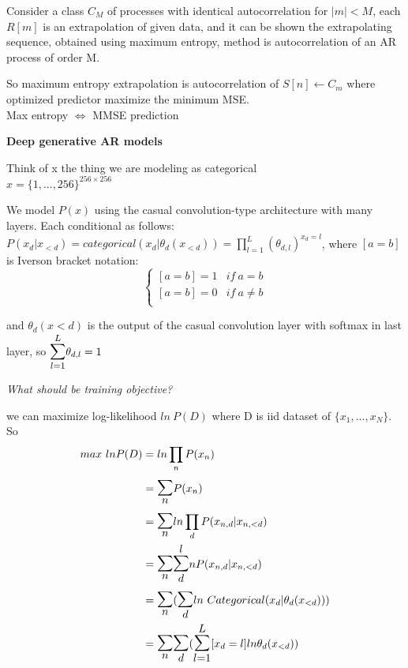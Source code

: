 \documentclass[12pt,a4paper]{article}
\begin{document}
Consider a class $C_M$ of processes with identical autocorrelation for $|m|<M$, each $R[m]$ is an extrapolation of given data, and it can be shown the extrapolating sequence, obtained using maximum entropy, method is autocorrelation of an AR process of order M. 

So maximum entropy extrapolation is autocorrelation of $S[n]\leftarrow C_m$ where optimized predictor maximize the minimum MSE. \\
Max entropy $\Leftrightarrow$ MMSE prediction

\vspace{0.5cm}
\textbf{Deep generative AR models}

Think of x the thing we are modeling as categorical\\
$x=\{1, ..., 256\}^{256\times 256}$

We model $P(x)$ using the casual convolution-type architecture with many layers. Each conditional as follows:\\
$P(x_d|x_{<d})=categorical(x_d|\theta_d(x_{<d}))=\prod_{l=1}^L (\theta_{d,l})^{x_d=l}$, where $[a=b]$ is Iverson bracket notation:
\begin{equation*}
\begin{cases}
[a=b]=1 & if\ a=b\\
[a=b]=0 & if\ a\neq b\\
\end{cases}
\end{equation*}

and $\theta_d(x<d)$ is the output of the casual convolution layer with softmax in last layer, so $\bsum{l=1}{L}\theta_{d,l}=1$


\vspace{0.5cm}
\textit{What should be training objective?}

we can maximize log-likelihood $ln\ P(D)$ where D is iid dataset of $\{x_1,...,x_N\}$. So\\
\begin{equation*}
    \begin{split}
max\ lnP(D) &= ln\prod_nP(x_n)\\
&=\bsum{n}{} P(x_n)\\
&=\bsum{n}{} ln\prod_dP(x_{n,d}|x_{n,<d})\\
&=\bsum{n}{} \bsum{d} ln P(x_{n,d}|x_{n,<d})\\
&=\bsum{n}{} (\bsum{d}{} ln\ Categorical(x_d|\theta_d(x_{<d})))\\
&=\bsum{n}{}\bsum{d}{}(\bsum{l=1}{L}[x_d=l]ln\theta_d(x_{<d}))\\
    \end{split}
\end{equation*}
\end{document}
